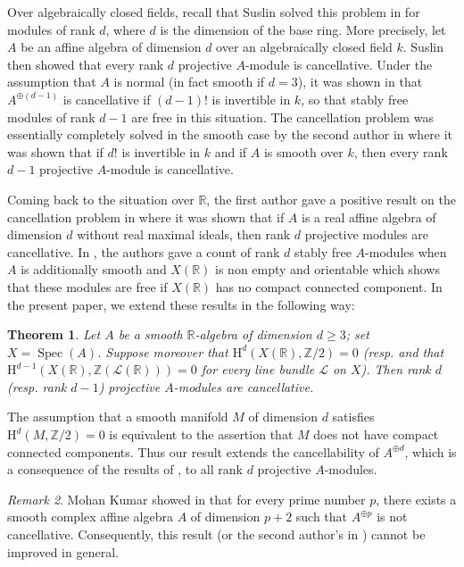 \documentclass[11pt,leqno]{amsart}
\newcommand{\Spec}{\operatorname{Spec}}
\renewcommand{\1}{{\rm 1\hspace*{-0.4ex}%
\rule{0.1ex}{1.52ex}\hspace*{0.2ex}}}
\renewcommand{\Lc}{{\mathcal L}}
\newcommand{\Hr}{{\mathrm {H}}}
\newcommand{\<}[1]{{\langle}#1 {\rangle}}
\newcommand{\Rb}{\mathbb{R}}
\newcommand{\Zb}{\mathbb{Z}}
\newcounter{intro}
\theoremstyle{plain}
\newtheorem{thmintro}{Theorem}
\theoremstyle{definition}
\theoremstyle{remark}
\newtheorem{remintro}[thmintro]{Remark}
\numberwithin{equation}{section}
\begin{document}
Over algebraically closed fields, recall that Suslin solved this problem in \cite{suslinCancellationTheoremProjective1977} for modules of rank $d$, where $d$ is the dimension of the base ring. More precisely, let $A$ be an affine algebra of dimension $d$ over an algebraically closed field $k$. Suslin then showed that every rank $d$ projective $A$-module is cancellative. Under the assumption that $A$ is normal (in fact smooth if $d=3$), it was shown in \cite{faselStablyFreeModules2012} that $A^{\oplus (d-1)}$ is cancellative if $(d-1)!$ is invertible in $k$, so that stably free modules of rank $d-1$ are free in this situation. The cancellation problem was essentially completely solved in the smooth case by the second author in \cite{faselSuslinsCancellationConjecture2025} where it was shown that if $d!$ is invertible in $k$ and if $A$ is smooth over $k$, then every rank $d-1$ projective $A$-module is cancellative.

Coming back to the situation over $\Rb$, the first author gave a positive result on the cancellation problem in \cite{banerjeeZeroCyclesMennicke2025} where it was shown that if $A$ is a real affine algebra of dimension $d$ without real maximal ideals, then rank $d$ projective modules are cancellative. In \cite{dasOrbitSpacesUnimodular2018}, the authors gave a count of rank $d$ stably free $A$-modules when $A$ is additionally smooth and $X(\Rb)$ is non empty and orientable which shows that these modules are free if $X(\Rb)$ has no compact connected component. In the present paper, we extend these results in the following way:

\begin{thmintro}
Let $A$ be a smooth $\Rb$-algebra of dimension $d\geq 3$; set $X=\Spec (A)$. Suppose moreover that $\Hr^d(X(\Rb),\Zb/2)=0$ (resp. and that $\Hr^{d-1}(X(\Rb),\Zb(\Lc(\Rb)))=0$ for every line bundle $\Lc$ on $X$). Then rank $d$ (resp. rank $d-1$) projective $A$-modules are cancellative.
\end{thmintro}

The assumption that a smooth manifold $M$ of dimension $d$ satisfies $\Hr^d(M,\Zb/2)=0$ is equivalent to the assertion that $M$ does not have compact connected components. Thus our result extends the cancellability of $A^{\oplus d}$, which is a consequence of the results of \cite{dasOrbitSpacesUnimodular2018}, to all rank $d$ projective $A$-modules.

\begin{remintro}
Mohan Kumar showed in \cite{kumarStablyFreeModules1985} that for every prime number $p$, there exists a smooth complex affine algebra $A$ of dimension $p+2$ such that $A^{\oplus p}$ is not cancellative. Consequently, this result (or the second author's in \cite{faselSuslinsCancellationConjecture2025}) cannot be improved in general.
\end{remintro} 
\end{document}
